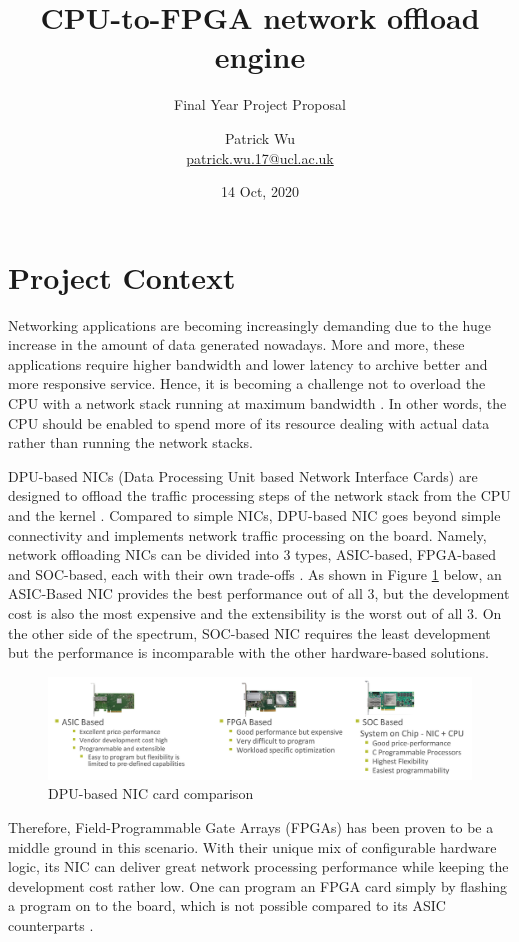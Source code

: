 \documentclass[a4paper,11pt]{scrartcl}
\title{CPU-to-FPGA network offload engine}
\subtitle{Final Year Project Proposal}
\author{Patrick Wu\\ \url{patrick.wu.17@ucl.ac.uk}}
\date{14 Oct, 2020}
\begin{document}
\maketitle

\section{Project Context}
Networking applications are becoming increasingly demanding due to the huge increase in the amount of data generated nowadays. More and more, these applications require higher bandwidth and lower latency to archive better and more responsive service. Hence, it is becoming a challenge not to overload the CPU with a network stack running at maximum bandwidth \cite{chen-2018}. In other words, the CPU should be enabled to spend more of its resource dealing with actual data rather than running the network stacks.

DPU-based NICs (Data Processing Unit based Network Interface Cards) are designed to offload the traffic processing steps of the network stack from the CPU and the kernel \cite{mellanox}. Compared to simple NICs, DPU-based NIC goes beyond simple connectivity and implements network traffic processing on the board. Namely, network offloading NICs can be divided into 3 types, ASIC-based, FPGA-based and SOC-based, each with their own trade-offs \cite{mellanox}. As shown in Figure \ref{nic-comparison} below, an ASIC-Based NIC provides the best performance out of all 3, but the development cost is also the most expensive and the extensibility is the worst out of all 3. On the other side of the spectrum, SOC-based NIC requires the least development but the performance is incomparable with the other hardware-based solutions.
\begin{figure}[h]
    \includegraphics[width=\textwidth]{imgs/nic1-1.jpg}
    \caption{DPU-based NIC card comparison}
    \label{nic-comparison}
\end{figure}

Therefore, Field-Programmable Gate Arrays (FPGAs) has been proven to be a middle ground in this scenario. With their unique mix of configurable hardware logic, its NIC can deliver great network processing performance while keeping the development cost rather low. One can program an FPGA card simply by flashing a program on to the board, which is not possible compared to its ASIC counterparts \cite{4068926}.
\end{document}
